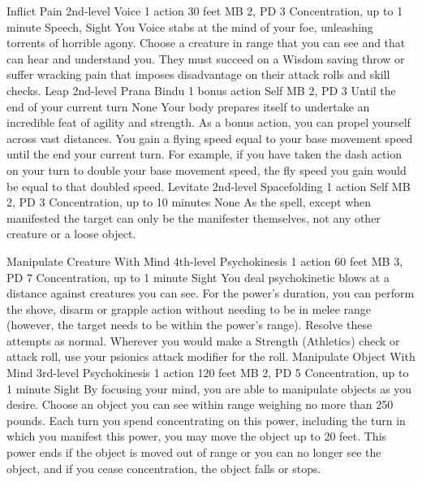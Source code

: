 \DndPowerHeader%
    {Inflict Pain\label{pwr:inflict_pain}}
    {2nd-level Voice}
    {1 action}
    {30 feet}
    {MB 2, PD 3}
    {Concentration, up to 1 minute}
    {Speech, Sight}
You Voice stabs at the mind of your foe,
unleashing torrents of horrible agony. Choose a creature in
range that you can see and that can hear and understand you.
They must succeed on a Wisdom saving
throw or suffer wracking pain that imposes disadvantage on
their attack rolls and skill checks.
\DndPowerHeader%
    {Leap\label{pwr:leap}}
    {2nd-level Prana Bindu}
    {1 bonus action}
    {Self}
    {MB 2, PD 3}
    {Until the end of your current turn}
    {None}
Your body prepares itself to undertake an
incredible feat of agility and strength. As a bonus action,
you can propel yourself across vast distances. You gain a
flying speed equal to your base movement speed until the end
your current turn. For example, if you have taken the dash
action on your turn to double your base movement speed, the
fly speed you gain would be equal to that doubled speed.
\DndPowerHeader%
    {Levitate\label{pwr:levitate}}
    {2nd-level Spacefolding}
    {1 action}
    {Self}
    {MB 2, PD 3}
    {Concentration, up to 10 minutes}
    {None}
As the  spell, except when
manifested the target can only be the manifester themselves,
not any other creature or a loose object.

\DndPowerHeader%
    {Manipulate Creature With Mind\label{pwr:manipulate_creature_with_mind}}
    {4th-level Psychokinesis}
    {1 action}
    {60 feet}
    {MB 3, PD 7}
    {Concentration, up to 1 minute}
    {Sight}
You deal psychokinetic blows at a distance
against creatures you can see. For the power's duration,
you can perform the shove, disarm or grapple action without
needing to be in melee range (however, the target needs to
be within the power's range).
Resolve these attempts as normal. Wherever you
would make a Strength (Athletics) check or attack roll, use
your psionics attack modifier for the roll.
\DndPowerHeader%
    {Manipulate Object With Mind\label{pwr:manipulate_object_with_mind}}
    {3rd-level Psychokinesis}
    {1 action}
    {120 feet}
    {MB 2, PD 5}
    {Concentration, up to 1 minute}
    {Sight}
By focusing your mind, you are able to manipulate
objects as you desire. Choose an object you can see within
range weighing no more than 250 pounds. Each turn you spend
concentrating on this power, including the turn in which you
manifest this power, you may move the object up to 20 feet.
This power ends if the object is moved out of range or you
can no longer see the object, and if you cease concentration,
the object falls or stops.

